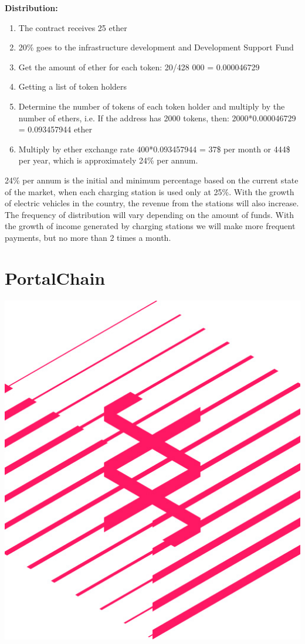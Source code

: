 \documentclass[a4paper,12pt]{report}
\begin{document}
\textbf{Distribution:}

\begin{enumerate}
	\item The contract receives 25 ether
	\item 20\% goes to the infrastructure development and Development Support Fund
	\item Get the amount of ether for each token: 20/428 000 = 0.000046729
	\item Getting a list of token holders
	\item Determine the number of tokens of each token holder and multiply by the number of ethers, i.e. If the address has 2000 tokens, then: 2000*0.000046729 = 0.093457944 ether
	\item  Multiply by ether exchange rate  400*0.093457944 = 37\$ per month or 444\$
	per year, which is approximately 24\% per annum.
	 
\end{enumerate}

24\% per annum is the initial and minimum percentage based on the current state of the market, when each charging station is used only at  25\%. With the growth of electric vehicles in the country, the revenue from the stations will also increase.
The frequency of distribution will vary depending on the amount of funds.  With the growth of income generated by charging stations we will make more frequent payments, but no more than 2 times a month.

\section{PortalChain}

\vspace*{0.5cm}
\includegraphics[width=13.6cm]{substrate-logo}
\vspace*{0.5cm}
\end{document}
